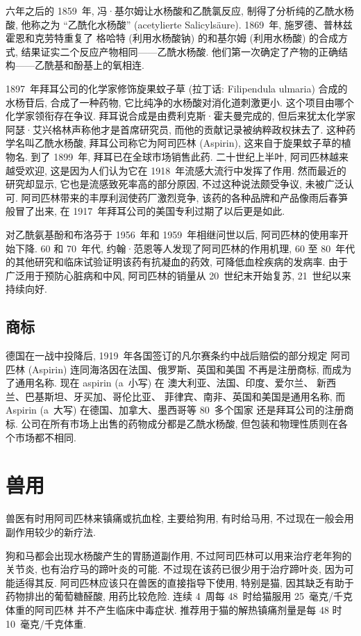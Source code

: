 六年之后的 1859~年, 冯·基尔姆让水杨酸和乙酰氯反应,
制得了分析纯的乙酰水杨酸, 他称之为
``乙酰化水杨酸''
(acetylierte Salicyls\"aure).
1869~年, 施罗德、普林兹霍恩和克劳特重复了%
格哈特 (利用水杨酸钠) 的和基尔姆 (利用水杨酸) 的合成方式,
结果证实二个反应产物相同——乙酰水杨酸.
他们第一次确定了产物的正确结构——乙酰基和酚基上的氧相连.

1897~年拜耳公司的化学家修饰旋果蚊子草 (拉丁话: Filipendula ulmaria)
合成的水杨苷后, 合成了一种药物,
它比纯净的水杨酸对消化道刺激更小.
这个项目由哪个化学家领衔存在争议.
拜耳说合成是由费利克斯·霍夫曼完成的,
但后来犹太化学家阿瑟·艾兴格林声称他才是首席研究员,
而他的贡献记录被纳粹政权抹去了.
这种药学名叫乙酰水杨酸,
拜耳公司称它为阿司匹林 (Aspirin),
这来自于旋果蚊子草的植物名.
到了 1899~年, 拜耳已在全球市场销售此药.
二十世纪上半叶, 阿司匹林越来越受欢迎,
这是因为人们认为它在 1918~年流感大流行中发挥了作用.
然而最近的研究却显示, 它也是流感致死率高的部分原因,
不过这种说法颇受争议, 未被广泛认可.
阿司匹林带来的丰厚利润使药厂激烈竞争,
该药的各种品牌和产品像雨后春笋般冒了出来,
在 1917~年拜耳公司的美国专利过期了以后更是如此.

对乙酰氨基酚和布洛芬于 1956~年和 1959~年相继问世以后,
阿司匹林的使用率开始下降.
60 和 70~年代, 约翰·范恩等人发现了阿司匹林的作用机理,
60 至 80~年代的其他研究和临床试验证明该药有抗凝血的药效,
可降低血栓疾病的发病率.
由于广泛用于预防心脏病和中风,
阿司匹林的销量从 20~世纪末开始复苏,
21~世纪以来持续向好.

\subsection{商标}

德国在一战中投降后,
1919~年各国签订的凡尔赛条约中战后赔偿的部分规定%
阿司匹林 (Aspirin) 连同海洛因在法国、俄罗斯、英国和美国%
不再是注册商标, 而成为了通用名称.
现在 aspirin (a~小写) 在%
澳大利亚、法国、印度、爱尔兰、%
新西兰、巴基斯坦、牙买加、哥伦比亚、%
菲律宾、南非、英国和美国是通用名称,
而 Aspirin (a~大写) 在德国、加拿大、墨西哥等 80~多个国家%
还是拜耳公司的注册商标.
公司在所有市场上出售的药物成分都是乙酰水杨酸,
但包装和物理性质则在各个市场都不相同.

\section{兽用}

兽医有时用阿司匹林来镇痛或抗血栓,
主要给狗用, 有时给马用,
不过现在一般会用副作用较少的新疗法.

狗和马都会出现水杨酸产生的胃肠道副作用,
不过阿司匹林可以用来治疗老年狗的关节炎,
也有治疗马的蹄叶炎的可能.
不过现在该药已很少用于治疗蹄叶炎,
因为可能适得其反.
阿司匹林应该只在兽医的直接指导下使用,
特别是猫, 因其缺乏有助于药物排出的葡萄糖醛酸,
用药比较危险.
连续 4~周每 48~时给猫服用 25~毫克/千克体重的阿司匹林%
并不产生临床中毒症状.
推荐用于猫的解热镇痛剂量是每 48 时 10~毫克/千克体重.
